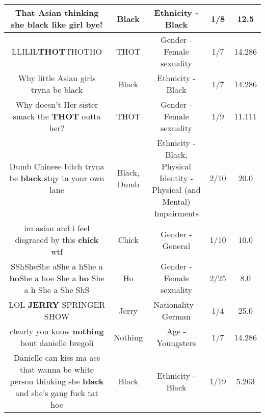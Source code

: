 \documentclass[11pt]{article}
\newlength\mylength
\begin{document}
\begin{center}
\begin{longtable}{|C{.65\mylength}|C{.30\mylength}|C{.12\mylength}|C{.12\mylength}|C{.12\mylength}|}
  \small That Asian thinking she \textbf{black} like girl bye!\normalsize   & Black & Ethnicity - Black & 1/8 & 12.5 \\  \hline
  \small LLILIL\textbf{THOT}THOTHO\normalsize   & THOT & Gender - Female sexuality & 1/7 & 14.286 \\  \hline
  \small Why little Asian girls tryna be black\normalsize   & Black & Ethnicity - Black & 1/7 & 14.286 \\  \hline
  \small Why doesn't Her sister smack the \textbf{THOT} outta her?\normalsize   & THOT & Gender - Female sexuality & 1/9 & 11.111 \\  \hline
  \small Dumb Chinese bitch tryna be \textbf{black}.stqy in your own lane\normalsize   & Black, Dumb & Ethnicity - Black, Physical Identity - Physical (and Mental) Impairments & 2/10 & 20.0 \\  \hline
  \small im asian and i feel disgraced by this \textbf{chick} wtf\normalsize   & Chick & Gender - General & 1/10 & 10.0 \\  \hline
  \small SShSheShe aShe a hShe a \textbf{ho}She a hoe She a \textbf{ho} She a h She a She ShS\normalsize   & Ho & Gender - Female sexuality & 2/25 & 8.0 \\  \hline
  \small LOL \textbf{JERRY} SPRINGER SHOW\normalsize   & Jerry & Nationality - German & 1/4 & 25.0 \\  \hline
  \small clearly you know \textbf{nothing} bout danielle bregoli\normalsize   & Nothing & Age - Youngsters & 1/7 & 14.286 \\  \hline
  \small Danielle can kiss ma ass that wanna be white person thinking she \textbf{black} and she's gang fuck tat hoe\normalsize   & Black & Ethnicity - Black & 1/19 & 5.263 \\  \hline

\end{longtable}
\end{center}
\end{document}
